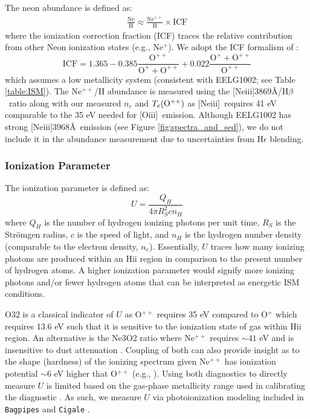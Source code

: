 \documentclass[twocolumn,tight,times,linenumbers]{aastex631}
\newcommand{\hbeta}{H$\beta$}
\newcommand{\oiii}{[O{\sc iii}]}
\newcommand{\neiii}{[Ne{\sc iii}]}
\begin{document}
		The neon abundance is defined as:
			\begin{eqnarray}
				\frac{\textrm{Ne}}{\textrm{H}} \approx \frac{\textrm{Ne}^{++}}{\textrm{H}} \times \textrm{ICF}
			\end{eqnarray}	
		where the ionization correction fraction (ICF) traces the relative contribution from other Neon ionization states (e.g., Ne$^+$). We adopt the ICF formalism of \citet{Izotov2006}: 
		\begin{equation}
				\textrm{ICF} = 1.365 -0.385\frac{\textrm{O}^{++}}{\textrm{O}^{+} + \textrm{O}^{++}} + 0.022\frac{\textrm{O}^{+} + \textrm{O}^{++}}{\textrm{O}^{++}}
		\end{equation}		
		which assumes a low metallicity system (consistent with EELG1002; see Table \ref{table:ISM}). The Ne$^{++}$/H abundance is measured using the \neiii3869\AA/\hbeta~ratio along with our measured $n_e$ and $T_e(\rm{O}^{++})$ as \neiii~requires 41 eV comparable to the 35 eV needed for \oiii~emission. Although EELG1002 has strong \neiii3968\AA~emission (see Figure \ref{fig:spectra_and_sed}), we do not include it in the abundance measurement due to uncertainties from H$\epsilon$ blending. %


		\subsubsection{Ionization Parameter}
		
		The ionization parameter is defined as:
		\begin{equation}
			U = \frac{Q_{H}}{4 \pi  R_S^2 c n_H}
			\label{eqn:logU}
		\end{equation}
		where $Q_H$ is the number of hydrogen ionizing photons per unit time, $R_S$ is the Str\"{o}mgen radius, $c$ is the speed of light, and $n_H$ is the hydrogen number density (comparable to the electron density, $n_e$). Essentially, $U$ traces how many ionizing photons are produced within an H{\sc ii} region in comparison to the present number of hydrogen atoms. A higher ionization parameter would signify more ionizing photons and/or fewer hydrogen atoms that can be interpreted as energetic ISM conditions.
		
		O32 is a classical indicator of $U$ as O$^{++}$ requires 35 eV compared to O$^{+}$ which requires 13.6 eV such that it is sensitive to the ionization state of gas within H{\sc ii} region. An alternative is the Ne3O2 ratio where Ne$^{++}$ requires $\sim 41$ eV and is insensitive to dust attenuation \citep{Levesque2014}. Coupling of both can also provide insight as to the shape (hardness) of the ionizing spectrum given Ne$^{++}$ has ionization potential $\sim 6$ eV higher that O$^{++}$ (e.g., \citealt{Strom2017,Jeong2020}). Using both diagnostics to directly measure $U$ is limited based on the gas-phase metallicity range used in calibrating the diagnostic \citep{Kewley2019}. As such, we measure $U$ via photoionization modeling included in \texttt{Bagpipes} \citep{Carnall2018} and \texttt{Cigale} \citep{Boquien2019}.
		
\end{document}
